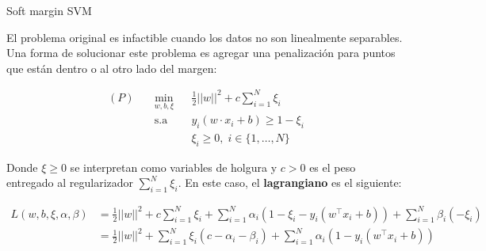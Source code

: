 \documentclass[handout, 9pt]{beamer}
\begin{document}
\begin{frame}{Soft margin SVM}

El problema original es infactible cuando los datos no son linealmente separables. Una forma de solucionar este problema es agregar una penalización para puntos que están dentro o al otro lado del margen:

\begin{equation*}
\begin{aligned}
(P)\quad & \underset{w,b, \xi}{\text{min}}
& & \frac{1}{2}||w||^2 + c\sum\limits_{i=1}^{N} \xi_i \\
& \text{s.a}
& & y_i (w\cdot x_i +b) \geq 1 - \xi_i\\
&&&\xi_i\geq0,\; i \in\{ 1, \ldots, N\}
\end{aligned}
\end{equation*}

Donde $\xi\geq 0$ se interpretan como variables de holgura y $c>0$ es el peso entregado al regularizador $\sum\limits_{i=1}^{N} \xi_i$. En este caso, el \textbf{lagrangiano} es el siguiente:

\begin{align*}
    L(w,b,\xi,\alpha,\beta)& = \frac{1}{2}||w||^2 + c\sum \limits_{i=1}^{N} \xi_i+ \sum\limits_{i=1}^{N} \alpha_i \left(1-\xi_i -y_i (w^\top x_i +b)\right) + \sum\limits_{i=1}^{N} \beta_i(-\xi_i)\\
    & = \frac{1}{2}||w||^2 + \sum\limits_{i=1}^{N} \xi_i\left(c-\alpha_i-\beta_i\right) + \sum\limits_{i=1}^{N} \alpha_i \left(1-y_i (w^\top x_i +b)\right)
\end{align*}

 \end{frame}
\end{document}
